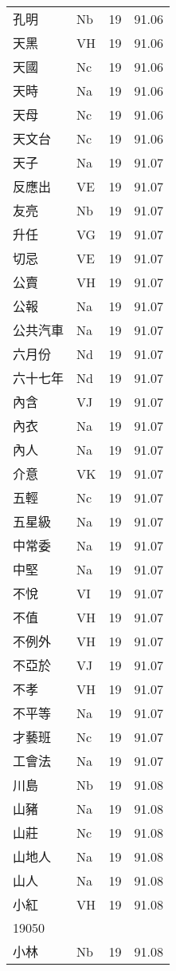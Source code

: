 \documentclass[twocolumn]{book}
\begin{document}
\begin{supertabular}{llrr}
孔明 & Nb & 19 &  91.06\\
天黑 & VH & 19 &  91.06\\
天國 & Nc & 19 &  91.06\\
天時 & Na & 19 &  91.06\\
天母 & Nc & 19 &  91.06\\
天文台 & Nc & 19 &  91.06\\
天子 & Na & 19 &  91.07\\
反應出 & VE & 19 &  91.07\\
友亮 & Nb & 19 &  91.07\\
升任 & VG & 19 &  91.07\\
切忌 & VE & 19 &  91.07\\
公賣 & VH & 19 &  91.07\\
公報 & Na & 19 &  91.07\\
公共汽車 & Na & 19 &  91.07\\
六月份 & Nd & 19 &  91.07\\
六十七年 & Nd & 19 &  91.07\\
內含 & VJ & 19 &  91.07\\
內衣 & Na & 19 &  91.07\\
內人 & Na & 19 &  91.07\\
介意 & VK & 19 &  91.07\\
五輕 & Nc & 19 &  91.07\\
五星級 & Na & 19 &  91.07\\
中常委 & Na & 19 &  91.07\\
中堅 & Na & 19 &  91.07\\
不悅 & VI & 19 &  91.07\\
不值 & VH & 19 &  91.07\\
不例外 & VH & 19 &  91.07\\
不亞於 & VJ & 19 &  91.07\\
不孝 & VH & 19 &  91.07\\
不平等 & Na & 19 &  91.07\\
才藝班 & Nc & 19 &  91.07\\
工會法 & Na & 19 &  91.07\\
川島 & Nb & 19 &  91.08\\
山豬 & Na & 19 &  91.08\\
山莊 & Nc & 19 &  91.08\\
山地人 & Na & 19 &  91.08\\
山人 & Na & 19 &  91.08\\
小紅 & VH & 19 &  91.08\\
19050\\
小林 & Nb & 19 &  91.08\\

\end{supertabular}
\end{document}
